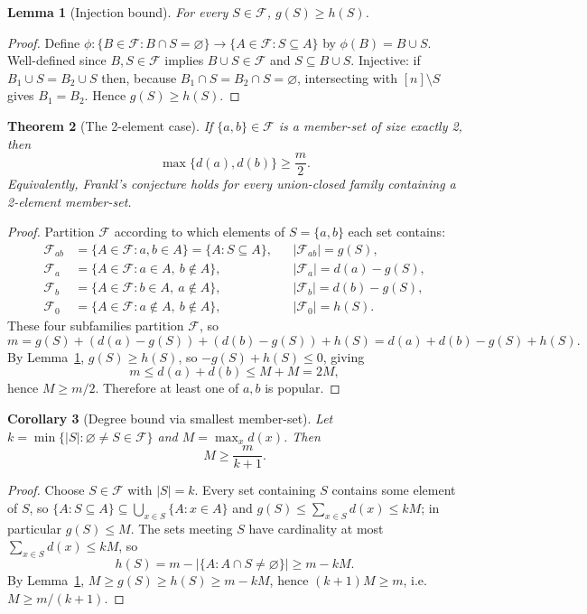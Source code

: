 \documentclass[11pt]{article}
\newtheorem{theorem}{Theorem}
\newtheorem{lemma}[theorem]{Lemma}
\newtheorem{corollary}[theorem]{Corollary}
\theoremstyle{definition}
\theoremstyle{remark}
\newcommand{\cF}{\mathcal{F}}
\newcommand{\emp}{\varnothing}
\begin{document}
\begin{lemma}[Injection bound]
\label{lem:injection}
For every $S\in\cF$, $g(S)\ge h(S)$.
\end{lemma}

\begin{proof}
Define $\phi:\{B\in\cF:B\cap S=\emp\}\to\{A\in\cF:S\subseteq A\}$ by
$\phi(B)=B\cup S$. Well-defined since $B,S\in\cF$ implies $B\cup S\in\cF$ and
$S\subseteq B\cup S$. Injective: if $B_1\cup S=B_2\cup S$ then, because
$B_1\cap S=B_2\cap S=\emp$, intersecting with $[n]\setminus S$ gives
$B_1=B_2$. Hence $g(S)\ge h(S)$.
\end{proof}

\begin{theorem}[The 2-element case]
\label{thm:twoelement}
If $\{a,b\}\in\cF$ is a member-set of size exactly 2, then
$$\max\{d(a),d(b)\}\ge \frac m2.$$
Equivalently, Frankl's conjecture holds for every union-closed family
containing a 2-element member-set.
\end{theorem}

\begin{proof}
Partition $\cF$ according to which elements of $S=\{a,b\}$ each set contains:
$$\begin{aligned}
\cF_{ab}&=\{A\in\cF:a,b\in A\}=\{A:S\subseteq A\}, &&|\cF_{ab}|=g(S),\\
\cF_a&=\{A\in\cF:a\in A,\ b\notin A\}, &&|\cF_a|=d(a)-g(S),\\
\cF_b&=\{A\in\cF:b\in A,\ a\notin A\}, &&|\cF_b|=d(b)-g(S),\\
\cF_0&=\{A\in\cF:a\notin A,\ b\notin A\}, &&|\cF_0|=h(S).
\end{aligned}$$
These four subfamilies partition $\cF$, so
$$m=g(S)+(d(a)-g(S))+(d(b)-g(S))+h(S)=d(a)+d(b)-g(S)+h(S).$$
By Lemma~\ref{lem:injection}, $g(S)\ge h(S)$, so $-g(S)+h(S)\le0$, giving
$$m\le d(a)+d(b)\le M+M=2M,$$
hence $M\ge m/2$. Therefore at least one of $a,b$ is popular.
\end{proof}

\begin{corollary}[Degree bound via smallest member-set]
\label{cor:degree}
Let $k=\min\{|S|:\emp\ne S\in\cF\}$ and $M=\max_x d(x)$. Then
$$M\ge \frac{m}{k+1}.$$
\end{corollary}

\begin{proof}
Choose $S\in\cF$ with $|S|=k$.
Every set containing $S$ contains some element of $S$, so
$\{A:S\subseteq A\}\subseteq\bigcup_{x\in S}\{A:x\in A\}$ and
$g(S)\le\sum_{x\in S}d(x)\le kM$; in particular $g(S)\le M$.
The sets meeting $S$ have cardinality at most $\sum_{x\in S}d(x)\le kM$, so
$$h(S)=m-\bigl|\{A:A\cap S\neq\emp\}\bigr|\ge m-kM.$$
By Lemma~\ref{lem:injection}, $M\ge g(S)\ge h(S)\ge m-kM$, hence
$(k+1)M\ge m$, i.e. $M\ge m/(k+1)$.
\end{proof}
\end{document}
